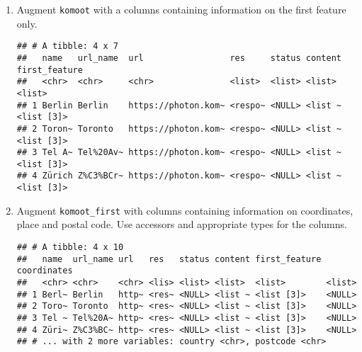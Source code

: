 \documentclass[]{book}
\newenvironment{Shaded}{\begin{snugshade}}{\end{snugshade}}
\newcommand{\DataTypeTok}[1]{\textcolor[rgb]{0.13,0.29,0.53}{#1}}
\newcommand{\KeywordTok}[1]{\textcolor[rgb]{0.13,0.29,0.53}{\textbf{#1}}}
\newcommand{\NormalTok}[1]{#1}
\newcommand{\OperatorTok}[1]{\textcolor[rgb]{0.81,0.36,0.00}{\textbf{#1}}}
\newcommand{\OtherTok}[1]{\textcolor[rgb]{0.56,0.35,0.01}{#1}}
\newcommand{\StringTok}[1]{\textcolor[rgb]{0.31,0.60,0.02}{#1}}
\begin{document}
\begin{enumerate}
\def\labelenumi{\arabic{enumi}.}
\item
  Augment \texttt{komoot} with a columns containing information on the first feature only.

\begin{verbatim}
## # A tibble: 4 x 7
##   name   url_name  url                 res     status content first_feature
##   <chr>  <chr>     <chr>               <list>  <list> <list>  <list>       
## 1 Berlin Berlin    https://photon.kom~ <respo~ <NULL> <list ~ <list [3]>   
## 2 Toron~ Toronto   https://photon.kom~ <respo~ <NULL> <list ~ <list [3]>   
## 3 Tel A~ Tel%20Av~ https://photon.kom~ <respo~ <NULL> <list ~ <list [3]>   
## 4 Zürich Z%C3%BCr~ https://photon.kom~ <respo~ <NULL> <list ~ <list [3]>
\end{verbatim}
\item
  Augment \texttt{komoot\_first} with columns containing information on coordinates, place and postal code. Use accessors and appropriate types for the columns.

\begin{Shaded}
\end{Shaded}

\begin{verbatim}
## # A tibble: 4 x 10
##   name  url_name url   res   status content first_feature coordinates
##   <chr> <chr>    <chr> <lis> <list> <list>  <list>        <list>     
## 1 Berl~ Berlin   http~ <res~ <NULL> <list ~ <list [3]>    <NULL>     
## 2 Toro~ Toronto  http~ <res~ <NULL> <list ~ <list [3]>    <NULL>     
## 3 Tel ~ Tel%20A~ http~ <res~ <NULL> <list ~ <list [3]>    <NULL>     
## 4 Züri~ Z%C3%BC~ http~ <res~ <NULL> <list ~ <list [3]>    <NULL>     
## # ... with 2 more variables: country <chr>, postcode <chr>
\end{verbatim}
\end{enumerate}
\end{document}
